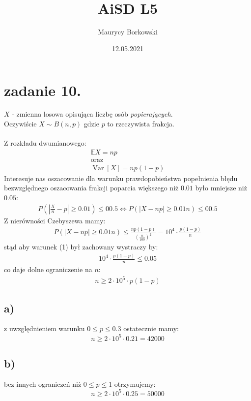 \documentclass{article}
\title{AiSD L5}
\date{12.05.2021}
\author{Maurycy Borkowski}
\begin{document}
\section{zadanie 10.}
$X$ - zmienna losowa opisująca liczbę osób \textit{popierających}. \\Oczywiście $X \sim B(n, p)$ gdzie $p$ to rzeczywista frakcja.\\\\
Z rozkładu dwumianowego:
\begin{align*}
\mathbb EX = np\\
\text{oraz}\\
\operatorname{Var}[X] = np(1-p)
\end{align*}
Interesuje nas oszacowanie dla warunku prawdopobieństwa popełnienia błędu bezwzględnego oszacowania frakcji poparcia większego niż $0.01$ było mniejsze niż $0.05$:
\begin{align}
P\left( \left|\frac X n-p\right| \geq 0.01 \right) \leq 00.5
\iff
P\left( |X-np| \geq 0.01n \right) \leq 00.5
\end{align}
Z nierówności Czebyszewa mamy:
\begin{align*}
P\left( |X-np| \geq 0.01n \right) \leq \frac{np(1-p)}{\left(\frac{n}{100} \right)^2} = 10^4 \cdot \frac{p(1-p)}{n}
\end{align*}
stąd aby warunek (1) był zachowany wystraczy by:
\begin{align*}
10^4 \cdot \frac{p(1-p)}{n} \leq 0.05
\end{align*}
co daje dolne ograniczenie na $n$:
\begin{align*}
n \geq 2\cdot10^5\cdot p(1-p)
\end{align*}
\subsection*{a)}
z uwzględnieniem warunku $0 \leq p \leq 0.3$ ostatecznie mamy:
$$
n \geq 2\cdot10^5\cdot 0.21 = 42000
$$
\subsection*{b)}
bez innych ograniczeń niż $0 \leq p \leq 1$ otrzymujemy:
$$
n \geq 2\cdot10^5\cdot 0.25 = 50000
$$
\clearpage
\setcounter{equation}{0}
\end{document}
